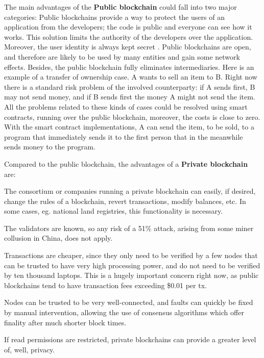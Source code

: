 \begin{outline}[enumerate]
    \1 The main advantages of the \textbf{Public blockchain} could fall into two major categories:
    \2 Public blockchains provide a way to protect the users of an application from the developers; 
    the code is public and everyone can see how it works. This solution limits the authority 
    of the developers over the application. Moreover, the user identity is always kept secret .   
    \2 Public blockchains are open, and therefore are likely to be used by many entities and gain 
    some network effects. Besides, the public blockchain fully eliminates intermediaries. Here is an example 
    of a transfer of ownership case. A wants to sell an item to B. Right now there is a standard risk 
    problem of the involved counterparty: if A sends first, B may not send money, and if B sends first the 
    money A might not send the item. All the problems related to these kinds of cases could be resolved using 
    smart contracts, running over the public blockchain, moreover, the costs is close to zero. 
    With the smart contract implementations, A can send the item, to be sold, to a program that immediately 
    sends it to the first person that in the meanwhile sends money to the program. 
    
    \1 Compared to the public blockchain, the advantages of a \textbf{Private blockchain} are:

    \2 The consortium or companies running a private blockchain can easily, if desired, change the rules 
    of a blockchain, revert transactions, modify balances, etc. In some cases, eg. national land 
    registries, this functionality is necessary.
    
    \2 The validators are known, so any risk of a 51\% attack, arising from some miner collusion in China, 
    does not apply.

    \2 Transactions are cheaper, since they only need to be verified by a few nodes that can be trusted 
    to have very high processing power, and do not need to be verified by ten thousand laptops. This is 
    a hugely important concern right now, as public blockchains tend to have transaction fees exceeding 
    \$0.01 per tx.

    \2 Nodes can be trusted to be very well-connected, and faults can quickly be fixed by manual intervention, 
    allowing the use of consensus algorithms which offer finality after much shorter block times. 

    \2 If read permissions are restricted, private blockchains can provide a greater level of, well, privacy.
\end{outline}

